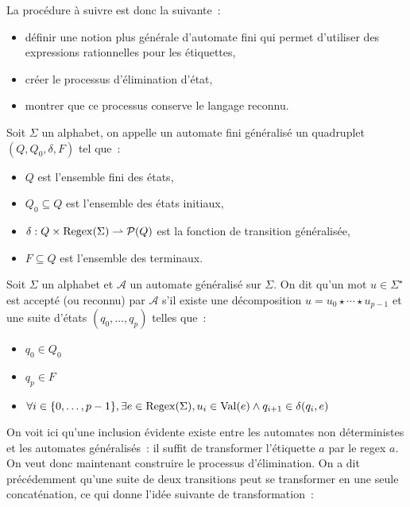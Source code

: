 La procédure à suivre est donc la suivante~:
\begin{itemize}
\item définir une notion plus générale d'automate fini qui permet d'utiliser des
  expressions rationnelles pour les étiquettes,
\item créer le processus d'élimination d'état,
\item montrer que ce processus conserve le langage reconnu.
\end{itemize}

\begin{definition}
  Soit $\Sigma$ un alphabet, on appelle un automate fini généralisé un
  quadruplet $(Q,Q_0,\delta,F)$ tel que~:
  \begin{itemize}
  \item $Q$ est l'ensemble fini des états,
  \item $Q_0\subseteq Q$ est l'ensemble des états initiaux,
  \item $\delta : Q \times \operatorname{Regex}(\Sigma) \rightharpoonup \mathcal{P}(Q)$ est la
    fonction de transition généralisée,
  \item $F\subseteq Q$ est l'ensemble des terminaux.
  \end{itemize}
\end{definition}

\begin{definition}
  Soit $\Sigma$ un alphabet et $\mathcal A$ un automate généralisé sur $\Sigma$.
  On dit qu'un mot $u\in \Sigma^\star$ est accepté (ou reconnu) par $\mathcal A$
  s'il existe une décomposition $u = u_0\star\cdots\star u_{p-1}$ et une suite
  d'états $(q_0,\ldots,q_p)$ telles que~:
  \begin{itemize}
  \item $q_0 \in Q_0$
  \item $q_p \in F$
  \item $\forall i \in \{0,\ldots,p-1\}, \exists e \in \operatorname{Regex}(\Sigma),
    u_i \in \operatorname{Val}(e) \land q_{i+1}\in \delta(q_i,e)$
  \end{itemize}
\end{definition}

On voit ici qu'une inclusion évidente existe entre les automates non
déterministes et les automates généralisés~: il suffit de transformer
l'étiquette $a$ par le regex $a$. On veut donc maintenant construire le
processus d'élimination. On a dit précédemment qu'une suite de deux transitions
peut se transformer en une seule concaténation, ce qui donne l'idée suivante de
transformation~:

